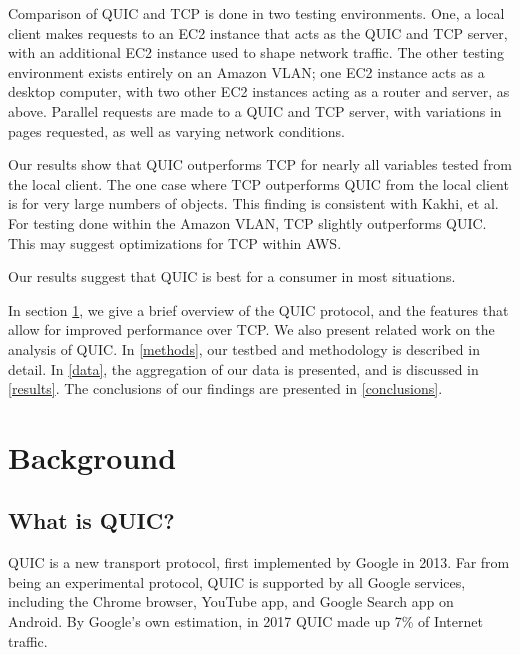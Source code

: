 \documentclass[12pt]{article}
\begin{document}
Comparison of QUIC and TCP is done in two testing environments. One, a local client makes requests to an EC2 instance that acts as the QUIC and TCP server, with an additional EC2 instance used to shape network traffic. The other testing environment exists entirely on an Amazon VLAN; one EC2 instance acts as a desktop computer, with two other EC2 instances acting as a router and server, as above. Parallel requests are made to a QUIC and TCP server, with variations in pages requested, as well as varying network conditions.

Our results show that QUIC outperforms TCP for nearly all variables tested from the local client. The one case where TCP outperforms QUIC from the local client is for very large numbers of objects. This finding is consistent with Kakhi, et al. For testing done within the Amazon VLAN, TCP slightly outperforms QUIC. This may suggest optimizations for TCP within AWS.

Our results suggest that QUIC is best for a consumer in most situations.

In section \ref{background}, we give a brief overview of the QUIC protocol, and the features that allow for improved performance over TCP. We also present related work on the analysis of QUIC. In \ref{methods}, our testbed and methodology is described in detail. In \ref{data}, the aggregation of our data is presented, and is discussed in \ref{results}. The conclusions of our findings are presented in \ref{conclusions}.

\section{Background}
\label{background}

\subsection{What is QUIC?}
\label{background:quic}

QUIC is a new transport protocol, first implemented by Google in 2013. Far from being an experimental protocol, QUIC is supported by all Google services, including the Chrome browser, YouTube app, and Google Search app on Android\cite{Langley:2017:QTP:3098822.3098842}. By Google's own estimation, in 2017 QUIC made up 7\% of Internet traffic\cite{Langley:2017:QTP:3098822.3098842}.
\end{document}
